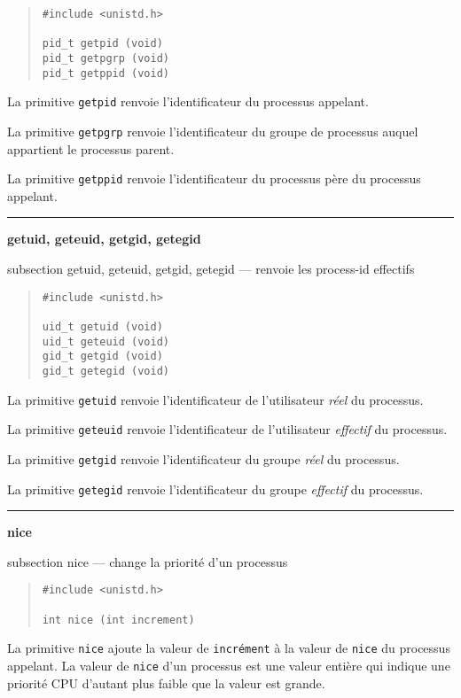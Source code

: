 \documentclass [twoside] {report}
\newcommand {\primitive} [1]
    {
	\phantomsection
	{\large \bf #1}
	\addcontentsline {toc} {subsection} {#1}
    }
\newcommand {\separation}
    {
	\vspace {5mm}
	\nopagebreak
	\hrule
    }
\begin{document}
\begin {quote}
\begin {verbatim}
#include <unistd.h>

pid_t getpid (void)
pid_t getpgrp (void)
pid_t getppid (void)
\end{verbatim}
\end {quote}

La primitive {\tt getpid} renvoie l'identificateur
du processus appelant.

La primitive {\tt getpgrp} renvoie l'identificateur
du groupe de processus auquel appartient le
processus parent.

La primitive {\tt getppid} renvoie l'identificateur
du processus père du processus appelant.




\separation
\primitive {getuid, geteuid, getgid, getegid} --- renvoie les process-id effectifs

\begin {quote}
\begin {verbatim}
#include <unistd.h>

uid_t getuid (void)
uid_t geteuid (void)
gid_t getgid (void)
gid_t getegid (void)
\end{verbatim}
\end {quote}

La primitive {\tt getuid} renvoie l'identificateur
de l'utilisateur {\it réel} du processus.

La primitive {\tt geteuid} renvoie l'identificateur
de l'utilisateur {\it effectif} du processus.

La primitive {\tt getgid} renvoie l'identificateur
du groupe {\it réel} du processus.

La primitive {\tt getegid} renvoie l'identificateur
du groupe {\it effectif} du processus.




\separation
\primitive {nice} --- change la priorité d'un processus

\begin {quote}
\begin {verbatim}
#include <unistd.h>

int nice (int increment)
\end{verbatim}
\end {quote}

La primitive {\tt nice} ajoute la valeur de
{\tt incrément} à la valeur de {\tt nice} du processus
appelant. La valeur de {\tt nice} d'un processus est
une valeur entière qui indique une priorité
CPU d'autant plus faible que la valeur est grande.
\end{document}
